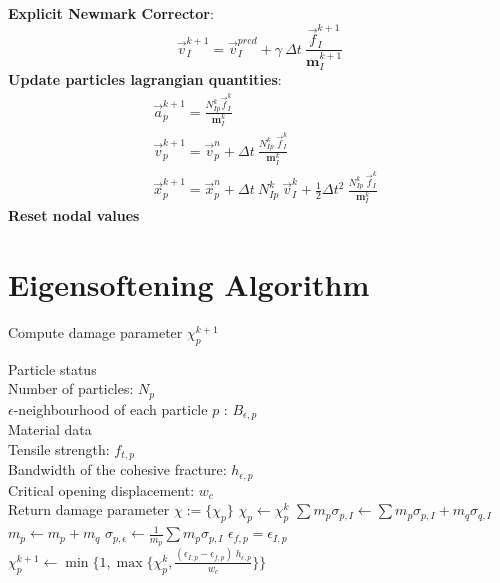 \documentclass[preprint,12pt,a4paper]{elsarticle}
\newcommand{\tens}[1]{
  \ensuremath{\mathbf{{#1}}}
}
\begin{document}
\begin{algorithm}
\begin{algorithmic}[1]
    \STATE \textbf{Explicit Newmark Corrector}:\\
    \begin{equation*}
      \vec{v}_{I}^{k+1} = \vec{v}_{I}^{pred} + \gamma\ \Delta t\ \frac{\vec{f}_{I}^{k+1}}{\tens{m}_I^{k+1}}  
    \end{equation*}
    \STATE \textbf{Update particles lagrangian quantities}:
    \begin{align*}
      &\vec{a}_p^{k+1} = \frac{N_{Ip}^k\vec{f}_{I}^{k}}{\tens{m}_I^k}\\
      &\vec{v}_p^{k+1} = \vec{v}_p^n + \Delta t\
        \frac{N_{Ip}^k\
        \vec{f}_{I}^{k}}{\tens{m}_I^k}\\
      &\vec{x}_p^{k+1} = \vec{x}_p^n + \Delta t\
         N_{Ip}^k\ \vec{v}_{I}^{k} +
        \frac{1}{2}\Delta t^2\ \frac{N_{Ip}^k\
        \vec{f}_{I}^{k}}{\tens{m}_I^k}
    \end{align*}
    \STATE \textbf{Reset nodal values}
  \end{algorithmic}
\end{algorithm} 


\section{Eigensoftening Algorithm}
\label{sec:eigens-algor-1}

\begin{algorithm}
  \caption{Compute damage parameter $\chi_p^{k+1}$}
  \label{alg-eigens}
  \begin{algorithmic}
    \Require Particle status\\
    Number of particles: $N_p$\\
    $\epsilon$-neighbourhood of each particle $p$ : $B_{\epsilon,p}$\\
    \Require Material data\\
    Tensile strength: $f_{t,p}$\\
    Bandwidth of the cohesive fracture: $h_{\epsilon,p}$ \\
    Critical opening displacement: $w_c$\\ 
    \Ensure Return damage parameter $\chi := \{\chi_p\}$
    \State $\chi_p \leftarrow \chi_p^{k}$
    \For{$p$ to $N_p$}
    \For{$q \in B_{\epsilon,p}$}
    \If{$\chi_q < 1$}    
    \State $\sum m_p\sigma_{p,I} \leftarrow \sum m_p\sigma_{p,I} + m_q\sigma_{q,I}$
    \EndIf    
    \State $m_p \leftarrow m_p + m_q$
    \EndFor
    \State $\sigma_{p,\epsilon} \leftarrow \frac{1}{m_p} \sum m_p\sigma_{p,I}$
    \State $\epsilon_{f,p} = \epsilon_{I,p}$   
    \EndIf        
    \Else[$\chi_p \neq 1$ \AND $\epsilon_{f,p} > 0$]
    \State $\chi_p^{k+1} \leftarrow \min\Big \{1 , \max \{\chi_p^{k},
    \frac{(\epsilon_{I,p}- \epsilon_{f,p})\ h_{\epsilon,p}}{w_c} \} \Big \}$    
    \EndIf    
    \EndFor
  \end{algorithmic}
\end{algorithm}

 
\end{document}
